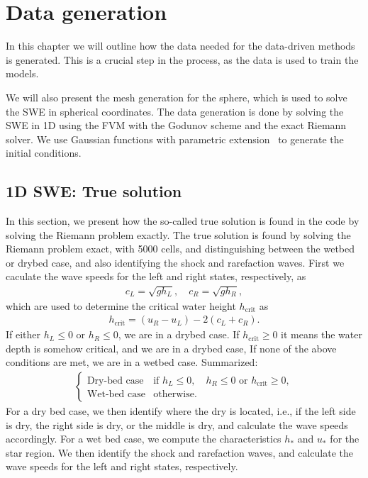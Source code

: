 \chapter{Data generation}\label{ch:method}
In this chapter we will outline how the data needed for the data-driven methods is generated.
This is a crucial step in the process, as the data is used to train the models. 

We will also present the mesh generation for the sphere, which is used to solve the SWE in spherical coordinates.
The data generation is done by solving the SWE in 1D using the FVM with the Godunov scheme and the exact Riemann solver.
We use Gaussian functions with parametric extension~\cite{Gaussian} to generate the initial conditions.


\section{1D SWE: True solution}
In this section, we present how the so-called true solution is found in the code by solving the Riemann problem exactly.
The true solution is found by solving the Riemann problem exact, with 5000 cells, and distinguishing between the wetbed or drybed case, and also identifying the shock and rarefaction waves.
First we caculate the wave speeds for the left and right states, respectively, as
\begin{align*}
    c_L = \sqrt{g h_L}, \quad c_R = \sqrt{g h_R},
\end{align*}
which are used to determine the critical water height $h_{\text{crit}}$ as
\begin{align*}
    h_{\text{crit}} = (u_R - u_L) - 2(c_L + c_R).
\end{align*}
If either $h_L \leq 0$ or $h_R \leq 0$, we are in a drybed case.
If $h_{\text{crit}} \geq 0$ it means the water depth is somehow critical, and we are in a drybed case,
If none of the above conditions are met, we are in a wetbed case.
Summarized:
\begin{align*}
    \begin{cases}
        \text{Dry-bed case} & \text{if }  h_L \leq 0, \quad  h_R \leq 0 \text{ or } h_{\text{crit}} \geq 0, \\
        \text{Wet-bed case} & \text{otherwise}.
    \end{cases}
\end{align*}
For a dry bed case, we then identify where the dry is located, i.e., if the left side is dry, the right side is dry, or the middle is dry, and calculate the wave speeds accordingly.
For a wet bed case, we compute the characteristics $h_*$ and $u_*$ for the star region.
We then identify the shock and rarefaction waves, and calculate the wave speeds for the left and right states, respectively.

